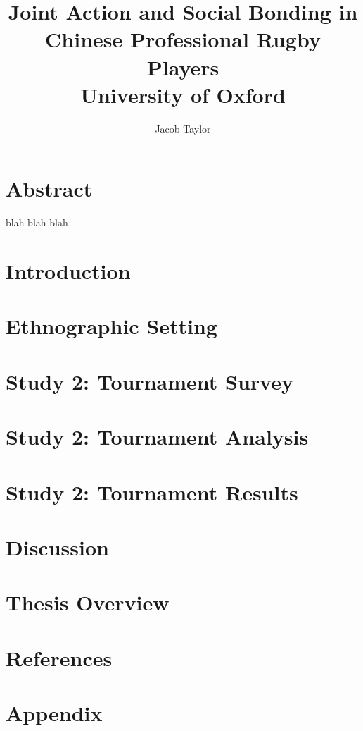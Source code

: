 \documentclass[12pt]{report}
\title{
{Joint Action and Social Bonding in Chinese Professional Rugby Players}\\
{\large University of Oxford}
}
\author{Jacob Taylor}
\begin{document}
\maketitle{}

\chapter*{Abstract}

blah blah blah\cite{Davis2015}

\tableofcontents

\chapter*{Introduction}



\chapter*{Ethnographic Setting}


\chapter*{Study 2: Tournament Survey}


\chapter*{Study 2: Tournament Analysis}


\chapter*{Study 2: Tournament Results}


\chapter*{Discussion}


\chapter*{Thesis Overview}


\chapter*{References}

\appendix
\chapter*{Appendix}




\printbibliography
\end{document}
